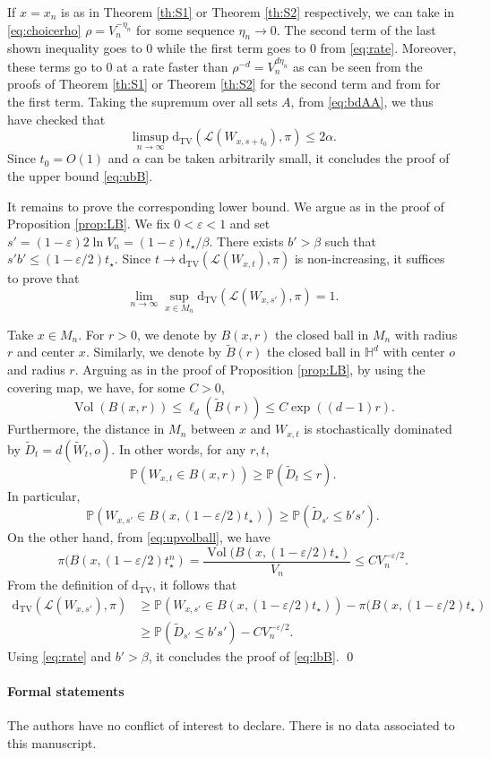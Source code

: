 \documentclass[]{scrartcl}
\newcommand{\DTV}{\mathrm{d_{TV}}}
\newcommand{\cL}{\mathcal L}
\newcommand{\dP}{\p}
\newcommand{\dH}{\mathds H}
\newcommand{\p}{\mathbb{P}}
\newcommand{\eps}{\varepsilon}
\DeclareMathOperator{\Vol}{Vol}
\numberwithin{equation}{section}
\numberwithin{figure}{section}
\begin{document}
If  $ x  = x_n$ is as in Theorem \ref{th:S1} or Theorem \ref{th:S2} respectively, we can take in \eqref{eq:choicerho} $\rho = V^{-\eta_n}_n$ for some sequence $\eta_n \to 0$. The second term of the last shown inequality goes to $0$ while the first term goes to $0$ from \eqref{eq:rate}. Moreover, these terms go to $0$ at a rate faster than $\rho^{-d} = V_n^{d \eta_n}$ as can be seen from the proofs of Theorem \ref{th:S1} or Theorem \ref{th:S2} for the second term and from \cite[Proposition 3.2]{MR3176419}  for the first term. Taking the supremum over all sets $A$, from \eqref{eq:bdAA}, we thus have checked that 
$$
\limsup_{n \to \infty} \DTV( \cL (W_{x,s + t_0}),\pi) \leq 2 \alpha. 
$$ 
Since $t_0 = O(1)$ and $\alpha$ can be taken arbitrarily small, it concludes the proof of the upper bound \eqref{eq:ubB}.






It remains to prove the corresponding lower bound. We argue as in the proof of Proposition \ref{prop:LB}. We fix $0 < \eps < 1$ and set $s' =  (1 - \eps) 2 \ln V_n = (1 -  \eps) t_\star / \beta $. There exists $b'>\beta$ such that $s' b' \leq (1 - \eps / 2) t_\star$. Since  $t \to \DTV(\cL( W_{x,t}) , \pi)$ is non-increasing, it suffices to prove that 
\begin{equation}\label{eq:lbB}
	\lim_{n \to \infty} \sup_{x \in M_n} \DTV( \cL( W_{x,s'}) , \pi )  = 1.  
\end{equation}



{Take $x \in M_n$. For $r > 0$, we denote by $B(x,r)$ the closed ball in $M_n$ with radius $r$ and center $x$. Similarly, we denote by $\widetilde B(r)$ the closed ball in $\dH^d$ with center $o$ and radius $r$. Arguing as in the proof of Proposition \ref{prop:LB}, by using the covering map, we have, for some $C >0$, 
	\begin{equation}\label{eq:upvolball}
		\Vol( B(x,r) ) \leq \ell_d ( \widetilde B (r) ) \leq  C \exp ( (d-1) r ).  
	\end{equation}
	Furthermore, the distance in $M_n$ between $x$ and $W_{x,t}$ is stochastically dominated by $\widetilde D_t = d(\widetilde W_{t},o)$. In other words, for any $r,t$,
	$$
	\dP ( W_{x,t} \in B ( x, r  ) ) \geq \dP ( \widetilde D_t  \leq  r  ).
	$$
	In particular,  
	$$
	\dP ( W_{x,s'} \in B ( x, (1-\eps/2)t_\star  ) ) \geq \dP ( \widetilde D_{s'}  \leq  b' s' ).
	$$  
	On the other hand, from \eqref{eq:upvolball}, we have 
	$$
	\pi( B ( x, (1-\eps/2)t^n_\star  ) =  \frac{\Vol (  B ( x, (1-\eps/2)t_\star )}{V_n} \leq C V_n^{-\eps /2}. 
	$$
	From the definition of $\DTV$, it follows that 
	\begin{align*}
	\DTV( \cL( W_{x,s'}) , \pi  ) &\geq \dP ( W_{x,s'} \in B ( x, (1-\eps/2)t_\star  ) ) - \pi( B ( x, (1-\eps/2)t_\star  ) \\&\geq \dP ( \widetilde D_{s'}  \leq  b' s' )  - C V_n^{-\eps /2}.
	\end{align*}
	Using \eqref{eq:rate} and $b' > \beta$, it concludes the proof of \eqref{eq:lbB}.
}
\qed



\paragraph{Formal statements}
The authors have no conflict of interest to declare. There is no data associated to this manuscript. 


\printbibliography
\end{document}
